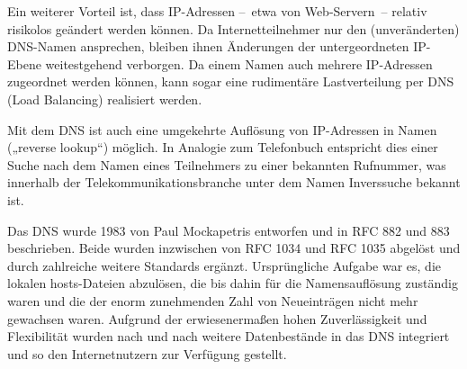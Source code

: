 Ein weiterer Vorteil ist, dass IP-Adressen – etwa von Web-Servern – relativ risikolos geändert werden können. Da Internetteilnehmer nur den (unveränderten) DNS-Namen ansprechen, bleiben ihnen Änderungen der untergeordneten IP-Ebene weitestgehend verborgen. 
Da einem Namen auch mehrere IP-Adressen zugeordnet werden können, kann sogar eine rudimentäre Lastverteilung per DNS (Load Balancing) realisiert werden.

Mit dem DNS ist auch eine umgekehrte Auflösung von IP-Adressen in Namen („reverse lookup“) möglich. In Analogie zum Telefonbuch entspricht dies einer Suche nach dem Namen eines Teilnehmers zu einer bekannten Rufnummer, was innerhalb der Telekommunikationsbranche unter dem Namen Inverssuche bekannt ist.

Das DNS wurde 1983 von Paul Mockapetris entworfen und in RFC 882 und 883 beschrieben. Beide wurden inzwischen von RFC 1034 und RFC 1035 abgelöst und durch zahlreiche weitere Standards ergänzt. 
Ursprüngliche Aufgabe war es, die lokalen hosts-Dateien abzulösen, die bis dahin für die Namensauflösung zuständig waren und die der enorm zunehmenden Zahl von Neueinträgen nicht mehr gewachsen waren.
Aufgrund der erwiesenermaßen hohen Zuverlässigkeit und Flexibilität wurden nach und nach weitere Datenbestände in das DNS integriert und so den Internetnutzern zur Verfügung gestellt.
